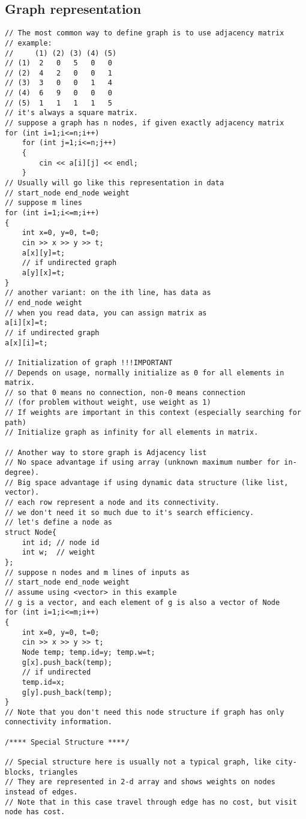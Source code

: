 \documentclass[a4paper]{article}
\begin{document}
\subsection{Graph representation}
\begin{verbatim}
// The most common way to define graph is to use adjacency matrix
// example:
//     (1) (2) (3) (4) (5)
// (1)  2   0   5   0   0
// (2)  4   2   0   0   1
// (3)  3   0   0   1   4
// (4)  6   9   0   0   0
// (5)  1   1   1   1   5
// it's always a square matrix.
// suppose a graph has n nodes, if given exactly adjacency matrix
for (int i=1;i<=n;i++)
	for (int j=1;i<=n;j++)
	{
		cin << a[i][j] << endl;
	}
// Usually will go like this representation in data
// start_node end_node weight
// suppose m lines
for (int i=1;i<=m;i++)
{
	int x=0, y=0, t=0;
	cin >> x >> y >> t;
	a[x][y]=t;
	// if undirected graph
	a[y][x]=t;
}
// another variant: on the ith line, has data as
// end_node weight
// when you read data, you can assign matrix as
a[i][x]=t;
// if undirected graph
a[x][i]=t;

// Initialization of graph !!!IMPORTANT
// Depends on usage, normally initialize as 0 for all elements in matrix.
// so that 0 means no connection, non-0 means connection
// (for problem without weight, use weight as 1)
// If weights are important in this context (especially searching for path)
// Initialize graph as infinity for all elements in matrix.

// Another way to store graph is Adjacency list
// No space advantage if using array (unknown maximum number for in-degree).
// Big space advantage if using dynamic data structure (like list, vector).
// each row represent a node and its connectivity.
// we don't need it so much due to it's search efficiency.
// let's define a node as
struct Node{
	int id; // node id
	int w;  // weight
};
// suppose n nodes and m lines of inputs as
// start_node end_node weight
// assume using <vector> in this example
// g is a vector, and each element of g is also a vector of Node
for (int i=1;i<=m;i++)
{
	int x=0, y=0, t=0;
	cin >> x >> y >> t;
	Node temp; temp.id=y; temp.w=t;
	g[x].push_back(temp);
	// if undirected
	temp.id=x;
	g[y].push_back(temp);
}
// Note that you don't need this node structure if graph has only connectivity information.

/**** Special Structure ****/

// Special structure here is usually not a typical graph, like city-blocks, triangles
// They are represented in 2-d array and shows weights on nodes instead of edges.
// Note that in this case travel through edge has no cost, but visit node has cost.


\end{verbatim}
\end{document}
